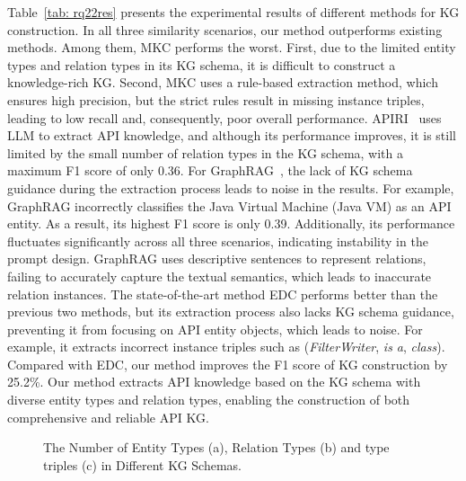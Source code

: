 Table~\ref{tab: rq22res} presents the experimental results of different methods for KG construction.
In all three similarity scenarios, our method outperforms existing methods.
Among them, MKC performs the worst.
First, due to the limited entity types and relation types in its KG schema, it is difficult to construct a knowledge-rich KG.
Second, MKC uses a rule-based extraction method, which ensures high precision, but the strict rules result in missing instance triples, leading to low recall and, consequently, poor overall performance.
APIRI~\cite{yanbang2} uses LLM to extract API knowledge, and although its performance improves, it is still limited by the small number of relation types in the KG schema, with a maximum F1 score of only 0.36.
For GraphRAG~\cite{GraphRAG}, the lack of KG schema guidance during the extraction process leads to noise in the results.
For example, GraphRAG incorrectly classifies the Java Virtual Machine (Java VM) as an API entity.
As a result, its highest F1 score is only 0.39.
Additionally, its performance fluctuates significantly across all three scenarios, indicating instability in the prompt design.
GraphRAG uses descriptive sentences to represent relations, failing to accurately capture the textual semantics, which leads to inaccurate relation instances.
The state-of-the-art method EDC performs better than the previous two methods, but its extraction process also lacks KG schema guidance, preventing it from focusing on API entity objects, which leads to noise.
For example, it extracts incorrect instance triples such as (\textit{FilterWriter}, \textit{is a}, \textit{class}).
Compared with EDC, our method improves the F1 score of KG construction by 25.2\%.
Our method extracts API knowledge based on the KG schema with diverse entity types and relation types, enabling the construction of both comprehensive and 
reliable API KG.

\begin{figure}[t]
    \centering
    \hfill
    \hfill
    \caption{The Number of Entity Types (a), Relation Types (b) and type triples (c) in Different KG Schemas.}
    \label{fig: schema comparison}
    \vspace{-4mm}
\end{figure}

